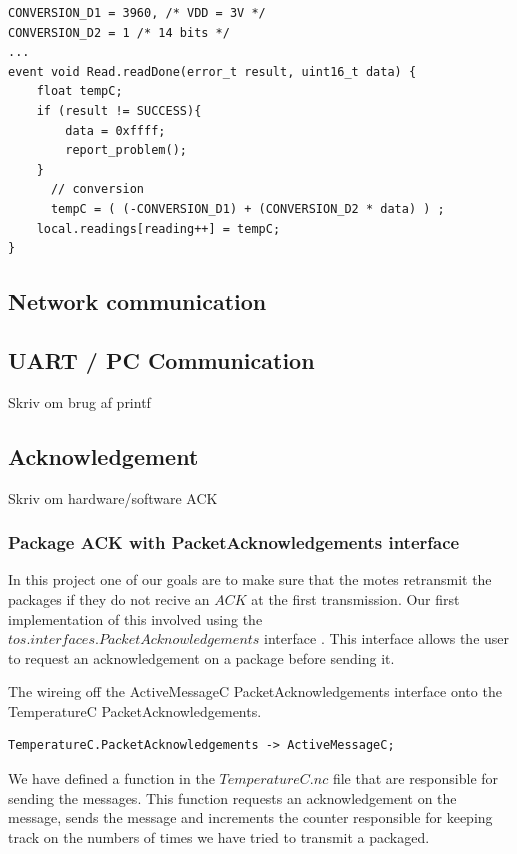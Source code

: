 \begin{lstlisting}
CONVERSION_D1 = 3960, /* VDD = 3V */
CONVERSION_D2 = 1 /* 14 bits */
...
event void Read.readDone(error_t result, uint16_t data) {
	float tempC;
	if (result != SUCCESS){
		data = 0xffff;
		report_problem();
	}
	  // conversion
	  tempC = ( (-CONVERSION_D1) + (CONVERSION_D2 * data) ) ;
    local.readings[reading++] = tempC;
}
\end{lstlisting}


\subsection{Network communication}

\subsection{UART / PC Communication}
Skriv om brug af printf

\subsection{Acknowledgement}
Skriv om hardware/software ACK

\subsubsection{Package ACK with PacketAcknowledgements interface}

In this project one of our goals are to make sure that the motes retransmit the
packages if they do not recive an $ACK$ at the first transmission. Our first
implementation of this involved using the
$tos.interfaces.PacketAcknowledgements$ interface \cite{telosbAPI}. This interface allows the
user to request an acknowledgement on a package before sending it.

The wireing off the ActiveMessageC PacketAcknowledgements interface onto the
TemperatureC PacketAcknowledgements.

\begin{lstlisting}[caption={TemperatureAppC.nc}]
 TemperatureC.PacketAcknowledgements -> ActiveMessageC;
\end{lstlisting}

We have defined a function in the $TemperatureC.nc$ file that are responsible
for sending the messages. This function requests an acknowledgement on the
message, sends the message and increments the counter responsible for keeping
track on the numbers of times we have tried to transmit a packaged.

